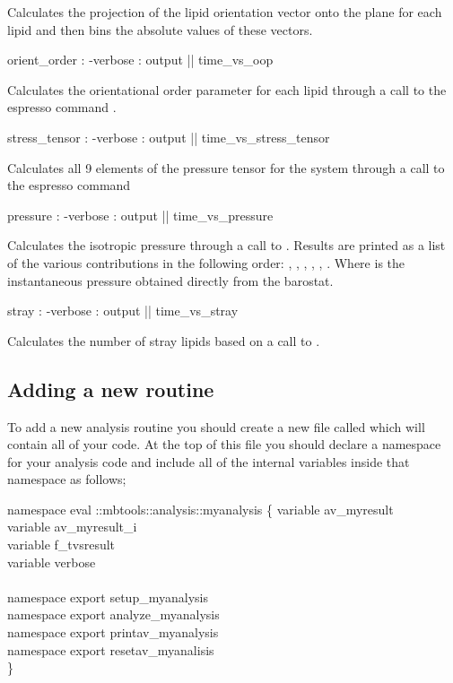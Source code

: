Calculates the projection of the lipid orientation vector onto the
 plane for each lipid and then bins the absolute values of
these vectors.
\begin{code}
  orient_order : -verbose : output || time_vs_oop
\end{code}
Calculates the orientational order parameter  for each lipid
through a call to the espresso command .
\begin{code}
  stress_tensor : -verbose : output || time_vs_stress_tensor
\end{code}
Calculates all 9 elements of the pressure tensor for the system
through a call to the espresso command 
\begin{code}
  pressure : -verbose : output || time_vs_pressure
\end{code}
Calculates the isotropic pressure through a call to . Results are printed as a list of the various
contributions in the following order: , ,
, , , . Where
 is the instantaneous pressure obtained directly from the
barostat.
\begin{code}
  stray : -verbose : output || time_vs_stray
\end{code}
Calculates the number of stray lipids based on a call to
.


\subsection{Adding a new routine}

To add a new analysis routine you should create a new file called
 which will contain all of your code. At the
top of this file you should declare a namespace for your analysis code
and include all of the internal variables inside that namespace as
follows;

\begin{code}
    namespace eval ::mbtools::analysis::myanalysis \{
	variable av_myresult \\
	variable av_myresult_i\\
	variable f_tvsresult\\
	variable verbose\\
	\\
	namespace export setup_myanalysis\\
	namespace export analyze_myanalysis\\
	namespace export printav_myanalysis\\
	namespace export resetav_myanalisis\\
    \}\\
  \end{code}


